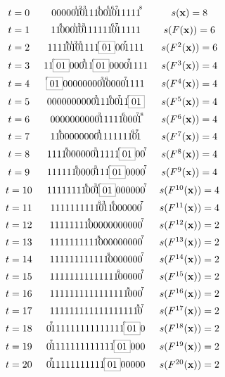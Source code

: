 \documentclass{sn-jnl}
\newcommand{\bx}{\mathbf{x}}
\newcommand{\gn}[1]{\!^{{}^{{#1}}}\!\!}
\begin{document}
\begin{figure}
   \[
    \xymatrix@C=0.2cm@R=-0.03cm{ 
 t=0 &   00000\gn{1}1\gn{2}0\gn{3}111\gn{4}00\gn{5}1\gn{6}0\gn{7}11111\gn{8} & s(\bx)=8 \\
t=1 & 11\gn{8}000\gn{1}1\gn{2}0\gn{3}111111\gn{6}0\gn{7}11111 & s(F(\bx))=6 \\
t=2 & 1111\gn{8}0\gn{1}1\gn{2}0\gn{3}1111\gn{6}\fcolorbox{gray}{white}{01}00\gn{7}1111 & s(F^2(\bx))=6 \\
t=3 & 11\gn{8}\fcolorbox{gray}{white}{01}000\gn{3}11\gn{6}\fcolorbox{gray}{white}{01}0000\gn{7}1111 & s(F^3(\bx))=4 \\
t=4 & \gn{8}\fcolorbox{gray}{white}{01}00000000\gn{3}1\gn{6}0000\gn{7}1111 & s(F^4(\bx))=4 \\
t=5 & 0000000000\gn{3}111\gn{6}00\gn{7}11\gn{8}\fcolorbox{gray}{white}{01} & s(F^5(\bx))=4 \\
t=6 & 0000000000\gn{3}11111\gn{6}000\gn{7}1\gn{8} & s(F^6(\bx))=4 \\
t=7 & 11\gn{8}00000000\gn{3}1111111\gn{6}0\gn{7}1 & s(F^7(\bx))=4 \\
t=8 & 1111\gn{8}000000\gn{3}11111\gn{6}\fcolorbox{gray}{white}{01}00\gn{7} & s(F^8(\bx))=4 \\
t=9 & 111111\gn{8}0000\gn{3}111\gn{6}\fcolorbox{gray}{white}{01}0000\gn{7} & s(F^9(\bx))=4 \\
t=10 & 11111111\gn{8}00\gn{3}1\gn{6}\fcolorbox{gray}{white}{01}000000\gn{7} & s(F^{10}(\bx))=4 \\
t=11 & 1111111111\gn{8}0\gn{3}11\gn{6}000000\gn{7} & s(F^{11}(\bx))=4 \\
t=12 & 11111111\gn{8}00000000000\gn{7} & s(F^{12}(\bx))=2 \\
t=13 & 1111111111\gn{8}000000000\gn{7} & s(F^{13}(\bx))=2 \\
t=14 & 111111111111\gn{8}0000000\gn{7} & s(F^{14}(\bx))=2 \\
t=15 & 11111111111111\gn{8}00000\gn{7} & s(F^{15}(\bx))=2 \\
t=16 & 1111111111111111\gn{8}000\gn{7} & s(F^{16}(\bx))=2 \\
t=17 & 111111111111111111\gn{8}0\gn{7} & s(F^{17}(\bx))=2 \\
t=18 & 0\gn{7}111111111111111\gn{8}\fcolorbox{gray}{white}{01}0 & s(F^{18}(\bx))=2 \\
t=19 & 0\gn{7}1111111111111\gn{8}\fcolorbox{gray}{white}{01}000 & s(F^{19}(\bx))=2 \\
t=20 & 0\gn{7}11111111111\gn{8}\fcolorbox{gray}{white}{01}00000 & s(F^{20}(\bx))=2 \\
}\]
\end{figure}
\end{document}
